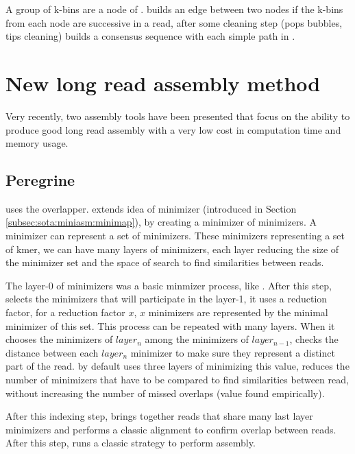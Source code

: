 \documentclass[main]{subfiles}
\begin{document}
A group of k-bins are a node of . \wtdbg builds an edge between two nodes if the k-bins from each node are successive in a read, after some cleaning step (pops bubbles, tips cleaning) \wtdbg builds a consensus sequence with each simple path in .

\section{New long read assembly method}

Very recently, two assembly tools have been presented that focus on the ability to produce good long read assembly with a very low cost in computation time and memory usage.

\subsection{Peregrine}

\newcommand{\shimmer}{}

\peregrine \cite{Peregrine} uses the \shimmer overlapper. \shimmer extends idea of minimizer (introduced in Section \ref{subsec:sota:miniasm:minimap}), by creating a minimizer of minimizers. A minimizer can represent a set of minimizers. These minimizers representing a set of kmer, we can have many layers of minimizers, each layer reducing the size of the minimizer set and the space of search to find similarities between reads.

The layer-0 of minimizers was a basic minmizer process, like \minimap. After this step, \shimmer selects the minimizers that will participate in the layer-1, it uses a reduction factor, for a reduction factor $x$, $x$ minimizers are represented by the minimal minimizer of this set. This process can be repeated with many layers. When it chooses the minimizers of $layer_n$ among the minimizers of $layer_{n-1}$, \shimmer checks the distance between each $layer_n$ minimizer to make sure they represent a distinct part of the read. \shimmer by default uses three layers of minimizing this value, reduces the number of minimizers that have to be compared to find similarities between read, without increasing the number of missed overlaps (value found empirically).

After this indexing step, \shimmer brings together reads that share many last layer minimizers and performs a classic alignment to confirm overlap between reads. After this step, \peregrine runs a classic \OLC strategy to perform assembly.
\end{document}
